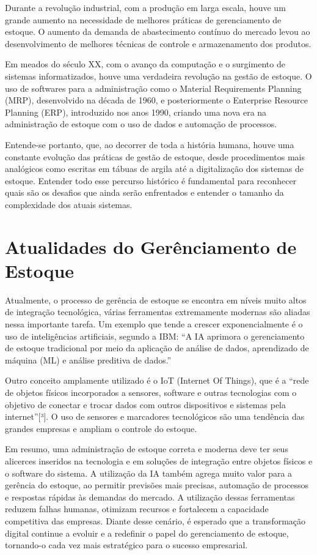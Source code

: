 \documentclass[
	12pt,				%
	openright,			%
	twoside,			%
	a4paper,			%
	english,			%
	french,				%
	spanish,			%
	brazil				%
	]{abntex2}
\begin{document}
Durante a revolução industrial, com a produção em larga escala, houve um grande aumento na necessidade de melhores práticas de gerenciamento de estoque. O aumento da demanda de abastecimento contínuo do mercado levou ao desenvolvimento de melhores técnicas de controle e armazenamento dos produtos.

Em meados do século XX, com o avanço da computação e o surgimento de sistemas informatizados, houve uma verdadeira revolução na gestão de estoque. O uso de softwares para a administração como o Material Requirements Planning (MRP), desenvolvido na década de 1960, e posteriormente o Enterprise Resource Planning (ERP), introduzido nos anos 1990, criando uma nova era na administração de estoque com o uso de dados e automação de processos.

Entende-se portanto, que, ao decorrer de toda a história humana, houve uma constante evolução das práticas de gestão de estoque, desde procedimentos mais analógicos como escritas em tábuas de argila até a digitalização dos sistemas de estoque. Entender todo esse percurso histórico é fundamental para reconhecer quais são os desafios que ainda serão enfrentados e entender o tamanho da complexidade dos atuais sistemas.

\section{Atualidades do Gerênciamento de Estoque}
Atualmente, o processo de gerência de estoque se encontra em níveis muito altos de integração tecnológica, várias ferramentas extremamente modernas são aliadas nessa importante tarefa. Um exemplo que tende a crescer exponencialmente é o uso de inteligências artificiais, segundo a IBM: “A IA aprimora o gerenciamento de estoque tradicional por meio da aplicação de análise de dados, aprendizado de máquina (ML) e análise preditiva de dados.”

Outro conceito amplamente utilizado é o IoT (Internet Of Things), que é a “rede de objetos físicos incorporados a sensores, software e outras tecnologias com o objetivo de conectar e trocar dados com outros dispositivos e sistemas pela internet”[³]. O uso de sensores e marcadores tecnológicos  são uma tendência das grandes empresas e ampliam o controle do estoque.

Em resumo, uma administração de estoque correta e moderna deve ter seus alicerces inseridos na tecnologia e em soluções de integração entre objetos físicos e o software do sistema. A utilização da IA também agrega muito valor para a gerência do estoque, ao permitir previsões mais precisas, automação de processos e respostas rápidas às demandas do mercado. A utilização dessas ferramentas reduzem falhas humanas, otimizam recursos e fortalecem a capacidade competitiva das empresas. Diante desse cenário, é esperado que a transformação digital continue a evoluir e a redefinir o papel do gerenciamento de estoque, tornando-o cada vez mais estratégico para o sucesso empresarial.
\end{document}
